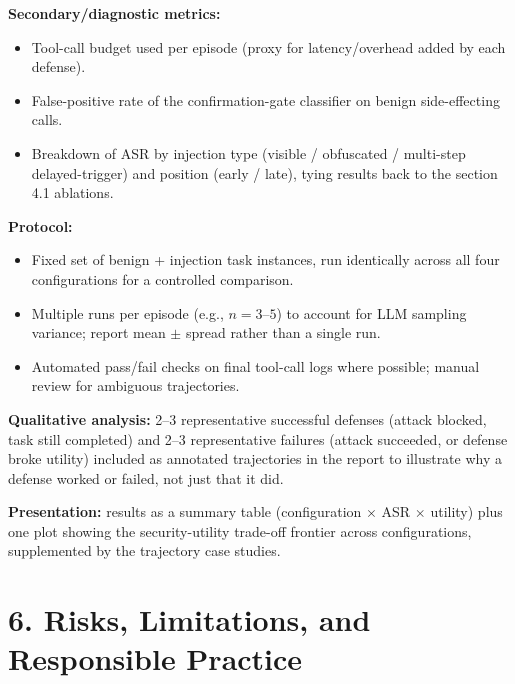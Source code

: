 \documentclass[11pt]{article}
\begin{document}
\textbf{Secondary/diagnostic metrics:}
\begin{itemize}[leftmargin=*,itemsep=0.25em]
    \item Tool-call budget used per episode (proxy for latency/overhead added by each defense).
    \item False-positive rate of the confirmation-gate classifier on benign side-effecting calls.
    \item Breakdown of ASR by injection type (visible / obfuscated / multi-step delayed-trigger) and position (early / late), tying results back to the section 4.1 ablations.
\end{itemize}

\textbf{Protocol:}
\begin{itemize}[leftmargin=*,itemsep=0.25em]
    \item Fixed set of benign + injection task instances, run identically across all four configurations for a controlled comparison.
    \item Multiple runs per episode (e.g., $n=3$–$5$) to account for LLM sampling variance; report mean $\pm$ spread rather than a single run.
    \item Automated pass/fail checks on final tool-call logs where possible; manual review for ambiguous trajectories.
\end{itemize}

\textbf{Qualitative analysis:} 2–3 representative successful defenses (attack blocked, task still completed) and 2–3 representative failures (attack succeeded, or defense broke utility) included as annotated trajectories in the report to illustrate why a defense worked or failed, not just that it did.

\textbf{Presentation:} results as a summary table (configuration $\times$ ASR $\times$ utility) plus one plot showing the security-utility trade-off frontier across configurations, supplemented by the trajectory case studies.

\section*{6. Risks, Limitations, and Responsible Practice}
\end{document}
